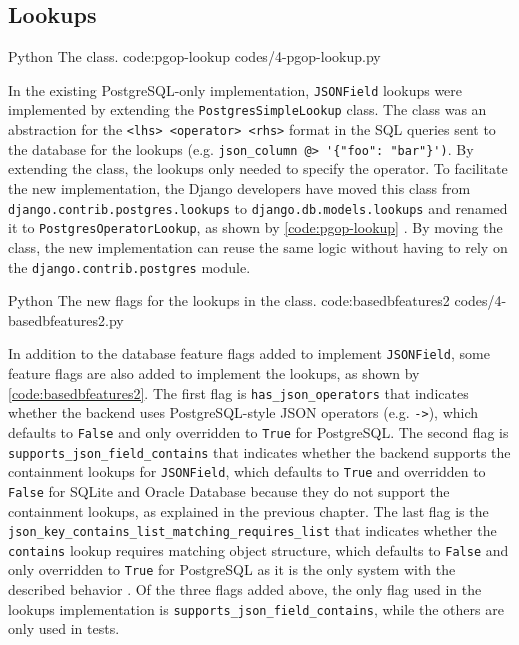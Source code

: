 \subsection{ Lookups}

\listing
{Python}
{The  class.}
{code:pgop-lookup}
{codes/4-pgop-lookup.py}

In the existing PostgreSQL-only implementation, \verb|JSONField| lookups were
implemented by extending the \verb|PostgresSimpleLookup| class. The class was
an abstraction for the \verb|<lhs> <operator> <rhs>| format in the SQL queries
sent to the database for the lookups (e.g.
\verb|json_column @> '{"foo": "bar"}')|. By extending the class, the lookups
only needed to specify the operator. To facilitate the new implementation, the
Django developers have moved this class from
\verb|django.contrib.postgres.lookups| to \verb|django.db.models.lookups| and
renamed it to \verb|PostgresOperatorLookup|, as shown by
\autoref{code:pgop-lookup} \cite{gh-django:pgop-lookup}. By moving the class,
the new implementation can reuse the same logic without having to rely on the
\verb|django.contrib.postgres| module.

\listing
{Python}
{The new flags for the  lookups in the  class.}
{code:basedbfeatures2}
{codes/4-basedbfeatures2.py}

In addition to the database feature flags added to implement \verb|JSONField|,
some feature flags are also added to implement the lookups, as shown by
\autoref{code:basedbfeatures2}. The first flag is \verb|has_json_operators|
that indicates whether the backend uses PostgreSQL-style JSON operators (e.g.
\verb|->|), which defaults to \verb|False| and only overridden to \verb|True|
for PostgreSQL. The second flag is \verb|supports_json_field_contains| that
indicates whether the backend supports the containment lookups for
\verb|JSONField|, which defaults to \verb|True| and overridden to \verb|False|
for SQLite and Oracle Database because they do not support the containment
lookups, as explained in the previous chapter. The last flag is the
\verb|json_key_contains_list_matching_requires_list| that indicates whether the
\verb|contains| lookup requires matching object structure, which defaults to
\verb|False| and only overridden to \verb|True| for PostgreSQL as it is the
only system with the described behavior \cite{postgres:json}. Of the three
flags added above, the only flag used in the lookups implementation is
\verb|supports_json_field_contains|, while the others are only used in tests.

